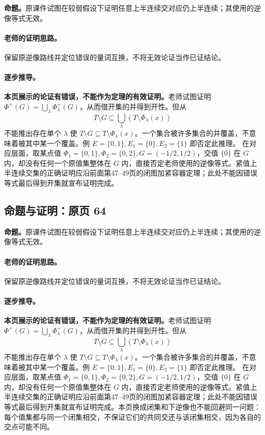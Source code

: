\documentclass[11pt,a4paper]{article}
\theoremstyle{definition}\newtheorem{definition}{定义}\newtheorem{example}{例}
\begin{document}
\textbf{命题。}原课件试图在较弱假设下证明任意上半连续交对应仍上半连续；其使用的逆像等式无效。

\paragraph{老师的证明思路。}保留原逆像路线并定位错误的量词互换，不将无效论证当作已证结论。

\paragraph{逐步推导。}\textbf{本页展示的论证有错误，不能作为定理的有效证明。}老师试图证明 $\Phi^+(G)=\bigcup_\lambda\Phi_\lambda^+(G)$，从而借开集的并得到开性。但从
\[T\setminus G\subseteq\bigcup_\lambda(T\setminus\Phi_\lambda(x))\]
不能推出存在单个 $\lambda$ 使 $T\setminus G\subseteq T\setminus\Phi_\lambda(x)$。一个集合被许多集合的并覆盖，不意味着被其中某一个覆盖。例 $E=\{0,1\},E_1=\{0\},E_2=\{1\}$ 即否定此推理。
在对应层面，取某点值 $\Phi_1=\{0,1\},\Phi_2=\{0,2\},G=(-1/2,1/2)$，交值 $\{0\}$ 在 $G$ 内，却没有任何一个原值集整体在 $G$ 内，直接否定老师使用的逆像等式。紧值上半连续交集的正确证明应沿前面第47--49页的闭图加紧容器定理；此处不能因错误等式最后得到开集就宣布证明完成。

\subsection{命题与证明：原页 64}

\textbf{命题。}原课件试图在较弱假设下证明任意上半连续交对应仍上半连续；其使用的逆像等式无效。

\paragraph{老师的证明思路。}保留原逆像路线并定位错误的量词互换，不将无效论证当作已证结论。

\paragraph{逐步推导。}\textbf{本页展示的论证有错误，不能作为定理的有效证明。}老师试图证明 $\Phi^+(G)=\bigcup_\lambda\Phi_\lambda^+(G)$，从而借开集的并得到开性。但从
\[T\setminus G\subseteq\bigcup_\lambda(T\setminus\Phi_\lambda(x))\]
不能推出存在单个 $\lambda$ 使 $T\setminus G\subseteq T\setminus\Phi_\lambda(x)$。一个集合被许多集合的并覆盖，不意味着被其中某一个覆盖。例 $E=\{0,1\},E_1=\{0\},E_2=\{1\}$ 即否定此推理。
在对应层面，取某点值 $\Phi_1=\{0,1\},\Phi_2=\{0,2\},G=(-1/2,1/2)$，交值 $\{0\}$ 在 $G$ 内，却没有任何一个原值集整体在 $G$ 内，直接否定老师使用的逆像等式。紧值上半连续交集的正确证明应沿前面第47--49页的闭图加紧容器定理；此处不能因错误等式最后得到开集就宣布证明完成。本页换成闭集和下逆像也不能回避同一问题：每个值集都与同一个闭集相交，不保证它们的共同交还与该闭集相交，因为各自的交点可能不同。
\end{document}
